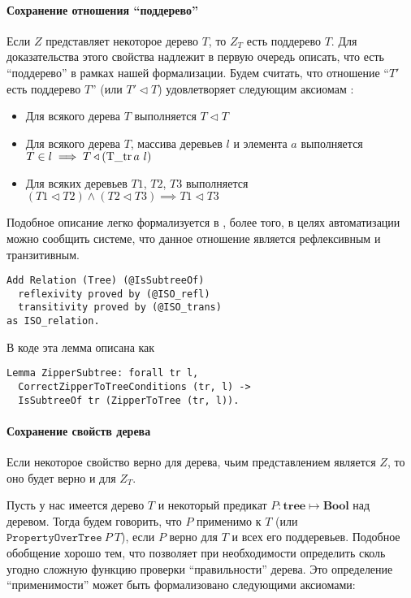 \paragraph{Сохранение отношения ``поддерево''}
Если $Z$ представляет некоторое дерево $T$, то $Z_T$ есть поддерево $T$. Для доказательства этого свойства надлежит в первую очередь описать, что есть ``поддерево'' в рамках нашей формализации. Будем считать, что отношение ``$T'$ есть поддерево $T$'' (или $T' \triangleleft T$) удовлетворяет следующим аксиомам \autocite{Okasaki1996} \autocite{Cormen2002}:
\begin{itemize}
\item Для всякого дерева $T$ выполняется $T \triangleleft T$
\item Для всякого дерева $T$, массива деревьев $l$ и элемента $a$ выполняется $T \in l \implies T \triangleleft (\operatorname{T\_tr} a \ l)$
\item Для всяких деревьев $T1$, $T2$, $T3$ выполняется $(T1 \triangleleft T2) \wedge (T2 \triangleleft T3) \implies T1 \triangleleft T3$
\end{itemize}

Подобное описание легко формализуется в \tcoq, более того, в целях автоматизации можно сообщить системе, что данное отношение является рефлексивным и транзитивным.

\begin{lstlisting}
Add Relation (Tree) (@IsSubtreeOf)
  reflexivity proved by (@ISO_refl)
  transitivity proved by (@ISO_trans)
as ISO_relation.
\end{lstlisting}

В коде эта лемма описана как
\begin{lstlisting}
Lemma ZipperSubtree: forall tr l,
  CorrectZipperToTreeConditions (tr, l) ->
  IsSubtreeOf tr (ZipperToTree (tr, l)).
\end{lstlisting}

\paragraph{Сохранение свойств дерева}
Если некоторое свойство верно для дерева, чьим представлением является $Z$, то оно будет верно и для $Z_T$. 

Пусть у нас имеется дерево $T$ и некоторый предикат $P : \textbf{tree} \mapsto \textbf{Bool}$ над деревом. Тогда будем говорить, что $P$ применимо к $T$ (или $\texttt{PropertyOverTree}\ P\ T$), если $P$ верно для $T$ и всех его поддеревьев. Подобное обобщение хорошо тем, что позволяет при необходимости определить сколь угодно сложную функцию проверки ``правильности'' дерева. Это определение ``применимости'' может быть формализовано следующими аксиомами:

